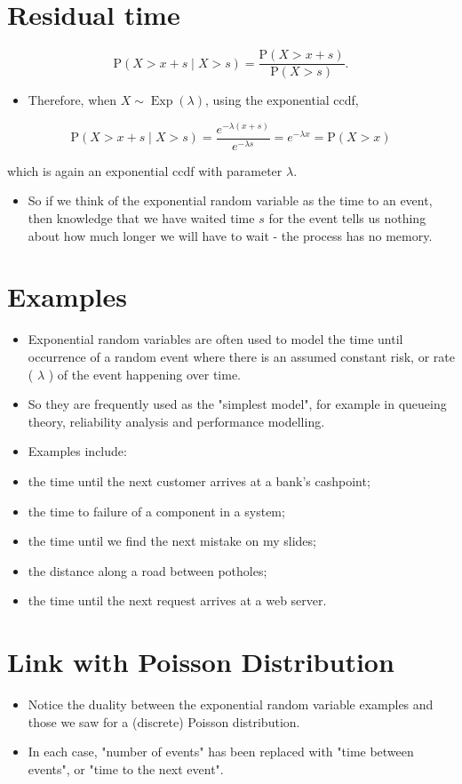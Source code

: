 \documentclass[10pt]{article}
\begin{document}
\section*{Residual time}
$$
\mathrm{P}(X>x+s \mid X>s)=\frac{\mathrm{P}(X>x+s)}{\mathrm{P}(X>s)} .
$$

\begin{itemize}
  \item Therefore, when $X \sim \operatorname{Exp}(\lambda)$, using the exponential ccdf,
\end{itemize}

$$
\mathrm{P}(X>x+s \mid X>s)=\frac{e^{-\lambda(x+s)}}{e^{-\lambda s}}=e^{-\lambda x}=\mathrm{P}(X>x)
$$

which is again an exponential ccdf with parameter $\lambda$.

\begin{itemize}
  \item So if we think of the exponential random variable as the time to an event, then knowledge that we have waited time $s$ for the event tells us nothing about how much longer we will have to wait - the process has no memory.
\end{itemize}

\section*{Examples}
\begin{itemize}
  \item Exponential random variables are often used to model the time until occurrence of a random event where there is an assumed constant risk, or rate ( $\lambda$ ) of the event happening over time.
  \item So they are frequently used as the "simplest model", for example in queueing theory, reliability analysis and performance modelling.
  \item Examples include:
  \item the time until the next customer arrives at a bank's cashpoint;
  \item the time to failure of a component in a system;
  \item the time until we find the next mistake on my slides;
  \item the distance along a road between potholes;
  \item the time until the next request arrives at a web server.
\end{itemize}

\section*{Link with Poisson Distribution}
\begin{itemize}
  \item Notice the duality between the exponential random variable examples and those we saw for a (discrete) Poisson distribution.
  \item In each case, "number of events" has been replaced with "time between events", or "time to the next event".
\end{itemize}
\end{document}
